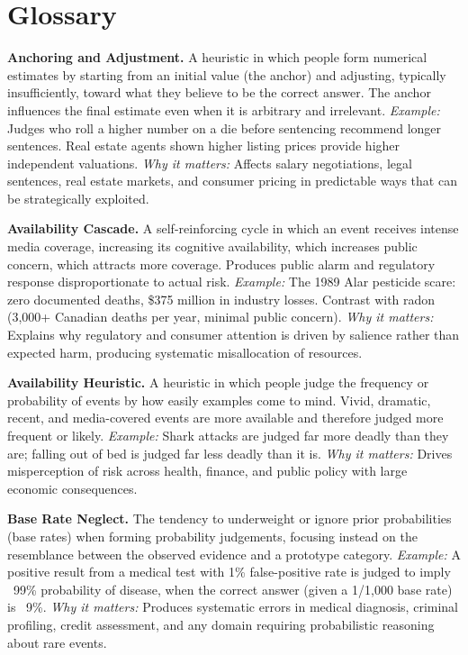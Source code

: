 \documentclass[12pt, letterpaper]{article}
\begin{document}
\medskip


\section*{Glossary}


\textbf{Anchoring and Adjustment.} A heuristic in which people form numerical estimates by starting from an initial value (the anchor) and adjusting, typically insufficiently, toward what they believe to be the correct answer. The anchor influences the final estimate even when it is arbitrary and irrelevant. \textit{Example:} Judges who roll a higher number on a die before sentencing recommend longer sentences. Real estate agents shown higher listing prices provide higher independent valuations. \textit{Why it matters:} Affects salary negotiations, legal sentences, real estate markets, and consumer pricing in predictable ways that can be strategically exploited.

\textbf{Availability Cascade.} A self-reinforcing cycle in which an event receives intense media coverage, increasing its cognitive availability, which increases public concern, which attracts more coverage. Produces public alarm and regulatory response disproportionate to actual risk. \textit{Example:} The 1989 Alar pesticide scare: zero documented deaths, \$375 million in industry losses. Contrast with radon (3,000+ Canadian deaths per year, minimal public concern). \textit{Why it matters:} Explains why regulatory and consumer attention is driven by salience rather than expected harm, producing systematic misallocation of resources.

\textbf{Availability Heuristic.} A heuristic in which people judge the frequency or probability of events by how easily examples come to mind. Vivid, dramatic, recent, and media-covered events are more available and therefore judged more frequent or likely. \textit{Example:} Shark attacks are judged far more deadly than they are; falling out of bed is judged far less deadly than it is. \textit{Why it matters:} Drives misperception of risk across health, finance, and public policy with large economic consequences.

\textbf{Base Rate Neglect.} The tendency to underweight or ignore prior probabilities (base rates) when forming probability judgements, focusing instead on the resemblance between the observed evidence and a prototype category. \textit{Example:} A positive result from a medical test with 1\% false-positive rate is judged to imply ~99\% probability of disease, when the correct answer (given a 1/1,000 base rate) is ~9\%. \textit{Why it matters:} Produces systematic errors in medical diagnosis, criminal profiling, credit assessment, and any domain requiring probabilistic reasoning about rare events.
\end{document}
